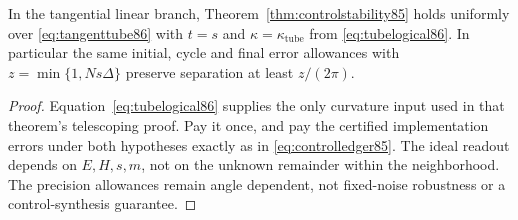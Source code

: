 \begin{corollary}
\label{cor:tubecontrols86}
In the tangential linear branch, Theorem~\ref{thm:controlstability85}
holds uniformly over \eqref{eq:tangenttube86} with $t=s$ and
$\kappa=\kappa_{\mathrm{tube}}$ from \eqref{eq:tubelogical86}.
In particular the same initial, cycle and final error allowances
with $z=\min\{1,Ns\Delta\}$ preserve separation at least $z/(2\pi)$.
\end{corollary}
\begin{proof}
Equation~\eqref{eq:tubelogical86} supplies the only curvature input
used in that theorem's telescoping proof.  Pay it once, and pay the
certified implementation errors under both hypotheses exactly as
in \eqref{eq:controlledger85}.  The ideal readout depends on
$E,H,s,m$, not on the unknown remainder within the neighborhood.
The precision allowances remain angle dependent, not fixed-noise
robustness or a control-synthesis guarantee.
\end{proof}
